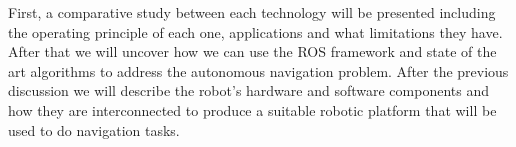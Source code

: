        { %
       First, a comparative study between each  technology will be presented including the operating principle of each one, applications and what limitations they have. 
       After that we will uncover how we can use the \ac{ROS} framework and state of the art algorithms  to address the autonomous navigation problem. After the previous discussion we will describe the robot's hardware and software components and how they are interconnected to produce a suitable robotic platform that will be used to do navigation tasks.
        }

